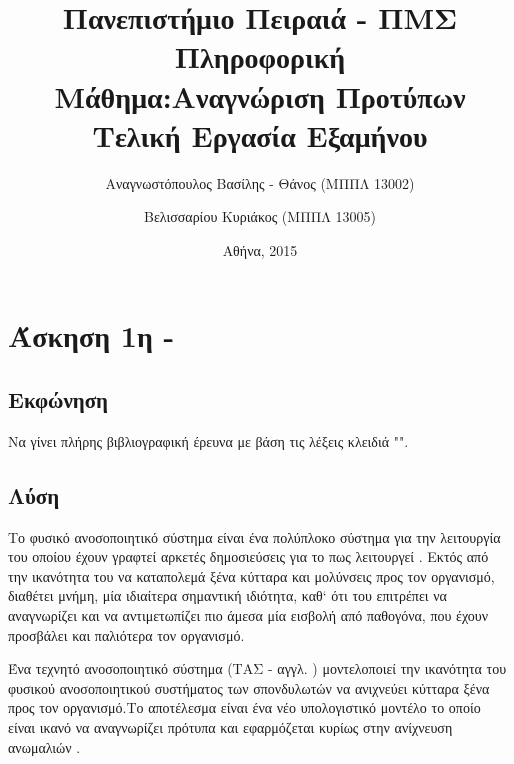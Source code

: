 \documentclass{assignment}
\title{Πανεπιστήμιο Πειραιά - ΠΜΣ Πληροφορική\\Μάθημα:Αναγνώριση Προτύπων \\ Τελική Εργασία Εξαμήνου }
\date{Αθήνα, 2015}
\author{Αναγνωστόπουλος Βασίλης - Θάνος (ΜΠΠΛ 13002) \and Βελισσαρίου Κυριάκος (ΜΠΠΛ 13005)}
\begin{document}
\maketitle

\setcounter{page}{1} 

\pagestyle{plain}
\tableofcontents
\listoffigures

\makeatletter
\newcommand{\newalgname}[1]{%
  \renewcommand{\ALG@name}{#1}%
}
\newalgname{Αλγόριθμος}
\renewcommand{\listalgorithmname}{Κατάλογος αλγορίθμων}
\makeatother

\listofalgorithms

\renewcommand\listoflistingscaption{Κατάλογος πηγαίου κώδικα}
\renewcommand\listingscaption{Πηγαίος κώδικας}

\listoflistings
\newpage

\setcounter{page}{1} 

\section{Άσκηση 1η - }
\subsection{Εκφώνηση}

Να γίνει πλήρης βιβλιογραφική έρευνα με βάση τις λέξεις κλειδιά "".

\subsection {Λύση}

Το φυσικό ανοσοποιητικό σύστημα είναι ένα πολύπλοκο σύστημα για την λειτουργία του οποίου έχουν γραφτεί αρκετές δημοσιεύσεις για το πως λειτουργεί \cite{wiki:immune_system}. Εκτός από την ικανότητα του να καταπολεμά ξένα κύτταρα και μολύνσεις προς τον οργανισμό, διαθέτει μνήμη, μία ιδιαίτερα σημαντική ιδιότητα, καθ` ότι του επιτρέπει να αναγνωρίζει και να αντιμετωπίζει πιο άμεσα μία εισβολή από παθογόνα, που έχουν προσβάλει και παλιότερα τον οργανισμό. 

Ένα τεχνητό ανοσοποιητικό σύστημα (ΤΑΣ - αγγλ. ) μοντελοποιεί την ικανότητα του φυσικού ανοσοποιητικού συστήματος των σπονδυλωτών να ανιχνεύει κύτταρα ξένα προς τον οργανισμό.Το αποτέλεσμα είναι ένα νέο υπολογιστικό μοντέλο το οποίο είναι ικανό να αναγνωρίζει πρότυπα και εφαρμόζεται κυρίως στην ανίχνευση ανωμαλιών \cite{engelbrecht,wiki:artificial_immune_system}.
\end{document}
